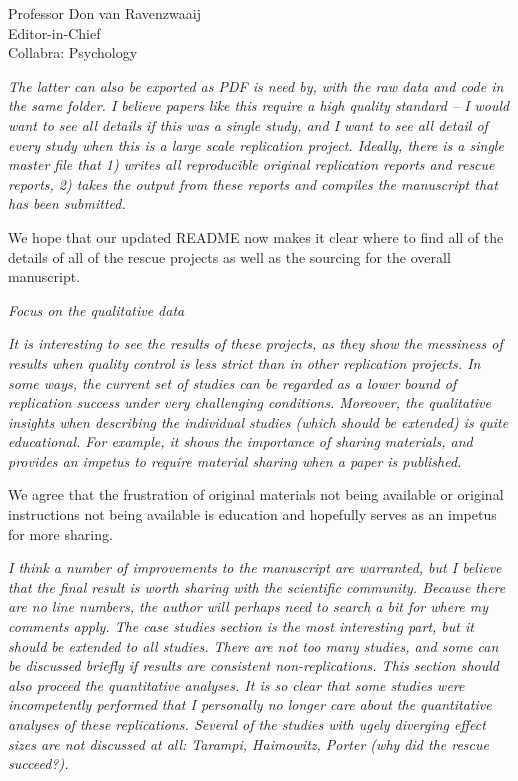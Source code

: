 \documentclass{stanfordletter}
\newcommand{\theysaid}[1]{\begin{leftbar} \noindent 
		\textsl{ #1}\end{leftbar}}
\newcommand{\revised}[1]{\begin{quote}	#1 \end{quote}}
\begin{document}
\begin{letter}{Professor Don van Ravenzwaaij \\ Editor-in-Chief \\ Collabra: Psychology }
		
		\theysaid{ The latter can also be exported as PDF is need by, with the raw data and code in the same folder. I believe papers like this require a high quality standard – I would want to see all details if this was a single study, and I want to see all detail of every study when this is a large scale replication project. Ideally, there is a single master file that 1) writes all reproducible original replication reports and rescue reports, 2) takes the output from these reports and compiles the manuscript that has been submitted.}
		
		We hope that our updated README now makes it clear where to find all of the details of all of the rescue projects as well as the sourcing for the overall manuscript. 
		
		
		\theysaid{Focus on the qualitative data}
		\theysaid{It is interesting to see the results of these projects, as they show the messiness of results when quality control is less strict than in other replication projects. In some ways, the current set of studies can be regarded as a lower bound of replication success under very challenging conditions. Moreover, the qualitative insights when describing the individual studies (which should be extended) is quite educational. For example, it shows the importance of sharing materials, and provides an impetus to require material sharing when a paper is published.}
		
		We agree that the frustration of original materials not being available or original instructions not being available is education and hopefully serves as an impetus for more sharing. 
		
		\theysaid{ I think a number of improvements to the manuscript are warranted, but I believe that the final result is worth sharing with the scientific community. Because there are no line numbers, the author will perhaps need to search a bit for where my comments apply.
		The case studies section is the most interesting part, but it should be extended to all studies.
		 There are not too many studies, and some can be discussed briefly if results are consistent non-replications. This section should also proceed the quantitative analyses. It is so clear that some studies were incompetently performed that I personally no longer care about the quantitative analyses of these replications. Several of the studies with ugely diverging effect sizes are not discussed at all: Tarampi, Haimowitz, Porter (why did the rescue succeed?).}
		 

\end{letter}
\end{document}
